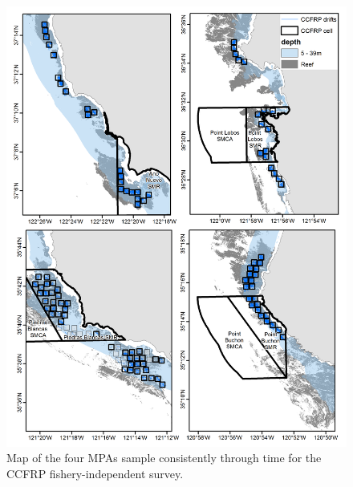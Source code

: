 \documentclass[12pt,]{article}
\begin{document}
\FloatBarrier 

\begin{figure}
\centering
\includegraphics{Figures/CCFRP_sites.png}
\caption{Map of the four MPAs sample consistently through time for the
CCFRP fishery-independent survey. \label{fig:CCFRP_sites}}
\end{figure}

\FloatBarrier
\end{document}
